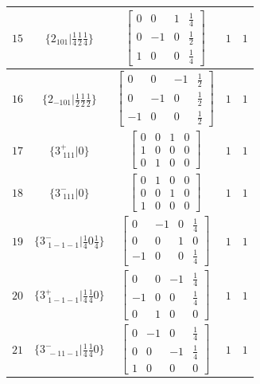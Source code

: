 \documentclass[fleqn,8pt]{jsarticle}
\begin{document}
\begin{longtable}{ccccc}
$ 15 $ & $ \{2{}_{101}|\frac{1}{4} \frac{1}{2} \frac{1}{4}\} $ & $ \begin{bmatrix} 0 & 0 & 1 & \frac{1}{4} \\ 0 & -1 & 0 & \frac{1}{2} \\ 1 & 0 & 0 & \frac{1}{4} \end{bmatrix} $ & $ 1 $ & $ 1 $ \\ \hline
$ 16 $ & $ \{2{}_{-101}|\frac{1}{2} \frac{1}{2} \frac{1}{2}\} $ & $ \begin{bmatrix} 0 & 0 & -1 & \frac{1}{2} \\ 0 & -1 & 0 & \frac{1}{2} \\ -1 & 0 & 0 & \frac{1}{2} \end{bmatrix} $ & $ 1 $ & $ 1 $ \\ \hline
$ 17 $ & $ \{3^{+}_{\,\,111}|0\} $ & $ \begin{bmatrix} 0 & 0 & 1 & 0 \\ 1 & 0 & 0 & 0 \\ 0 & 1 & 0 & 0 \end{bmatrix} $ & $ 1 $ & $ 1 $ \\ \hline
$ 18 $ & $ \{3^{-}_{\,\,111}|0\} $ & $ \begin{bmatrix} 0 & 1 & 0 & 0 \\ 0 & 0 & 1 & 0 \\ 1 & 0 & 0 & 0 \end{bmatrix} $ & $ 1 $ & $ 1 $ \\ \hline
$ 19 $ & $ \{3^{-}_{\,\,1-1-1}|\frac{1}{4} 0 \frac{1}{4}\} $ & $ \begin{bmatrix} 0 & -1 & 0 & \frac{1}{4} \\ 0 & 0 & 1 & 0 \\ -1 & 0 & 0 & \frac{1}{4} \end{bmatrix} $ & $ 1 $ & $ 1 $ \\ \hline
$ 20 $ & $ \{3^{+}_{\,\,1-1-1}|\frac{1}{4} \frac{1}{4} 0\} $ & $ \begin{bmatrix} 0 & 0 & -1 & \frac{1}{4} \\ -1 & 0 & 0 & \frac{1}{4} \\ 0 & 1 & 0 & 0 \end{bmatrix} $ & $ 1 $ & $ 1 $ \\ \hline
$ 21 $ & $ \{3^{-}_{\,\,-11-1}|\frac{1}{4} \frac{1}{4} 0\} $ & $ \begin{bmatrix} 0 & -1 & 0 & \frac{1}{4} \\ 0 & 0 & -1 & \frac{1}{4} \\ 1 & 0 & 0 & 0 \end{bmatrix} $ & $ 1 $ & $ 1 $ \\ \hline

\end{longtable}
\end{document}
